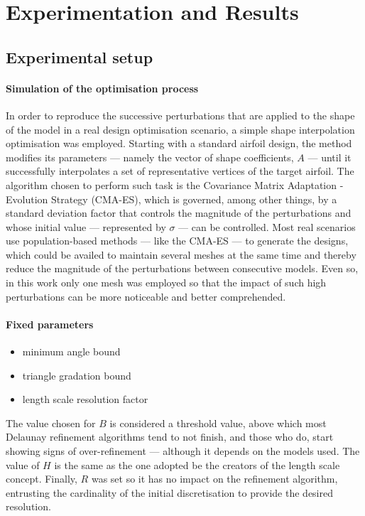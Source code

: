 \section{Experimentation and Results}

\subsection{Experimental setup}

\paragraph{Simulation of the optimisation process} In order to reproduce the successive perturbations that are applied to the shape of the model in a real design optimisation scenario, a simple shape interpolation optimisation was employed. Starting with a standard airfoil design, the method modifies its parameters --- namely the vector of shape coefficients, $A$ --- until it successfully interpolates a set of representative vertices of the target airfoil. The algorithm chosen to perform such task is the Covariance Matrix Adaptation - Evolution Strategy (CMA-ES), which is governed, among other things, by a standard deviation factor that controls the magnitude of the perturbations and whose initial value --- represented by $\sigma$ --- can be controlled. Most real scenarios use population-based methods --- like the CMA-ES --- to generate the designs, which could be availed to maintain several meshes at the same time and thereby reduce the magnitude of the perturbations between consecutive models. Even so, in this work only one mesh was employed so that the impact of such high perturbations can be more noticeable and better comprehended.

\paragraph{Fixed parameters}
\begin{itemize}
\item {} minimum angle bound
\item {} triangle gradation bound
\item {} length scale resolution factor
\end{itemize}
The value chosen for $B$ is considered a threshold value, above which most Delaunay refinement algorithms tend to not finish, and those who do, start showing signs of over-refinement --- although it depends on the models used. The value of $H$ is the same as the one adopted be the creators of the length scale concept. Finally, $R$ was set so it has no impact on the refinement algorithm, entrusting the cardinality of the initial discretisation to provide the desired resolution.


